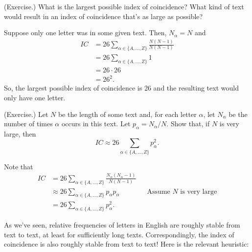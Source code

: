 \documentclass[letterpaper]{article}
\begin{document}
\begin{mdframed}
    (Exercise.) What is the largest possible index of coincidence? What kind of text would result in an index of coincidence that’s as large as possible?

    \begin{mdframed}
        Suppose only one letter was in some given text. Then, $N_\alpha = N$ and 
        \begin{equation*}
            \begin{aligned}
                IC &= 26 \sum_{\alpha \in \{A, \hdots, Z\}} \frac{N (N - 1)}{N(N - 1)} \\ 
                    &= 26 \sum_{\alpha \in \{A, \hdots, Z\}} 1 \\ 
                    &= 26 \cdot 26 \\ 
                    &= 26^2.
            \end{aligned}
        \end{equation*}
        So, the largest possible index of coincidence is 26 and the resulting text would only have one letter.
    \end{mdframed}
\end{mdframed}

\begin{mdframed}
    (Exercise.) Let $N$ be the length of some text and, for each letter $\alpha$, let $N_\alpha$ be the number of times $\alpha$ occurs in this text. Let $p_\alpha = N_\alpha / N$. Show that, if $N$ is very large, then 
    \[IC \approx 26 \sum_{\alpha \in \{A, \hdots, Z\}} p_\alpha^2.\]

    \begin{mdframed}
        Note that 
        \begin{equation*}
            \begin{aligned}
                IC &= 26 \sum_{\alpha \in \{A, \hdots, Z\}} \frac{N_\alpha (N_\alpha - 1)}{N(N - 1)} \\
                    &\approx 26 \sum_{\alpha \in \{A, \hdots, Z\}} p_{\alpha} p_{\alpha} && \text{Assume } N \text{ is very large} \\ 
                    &= 26 \sum_{\alpha \in \{A, \hdots, Z\}} p_\alpha^2.
            \end{aligned}
        \end{equation*}
    \end{mdframed}
\end{mdframed}

As we've seen, relative frequencies of letters in English are roughly stable from text to text, at least for sufficiently long texts. Correspondingly, the index of coincidence is also roughly stable from text to text! Here is the relevant heuristic:
\end{document}
